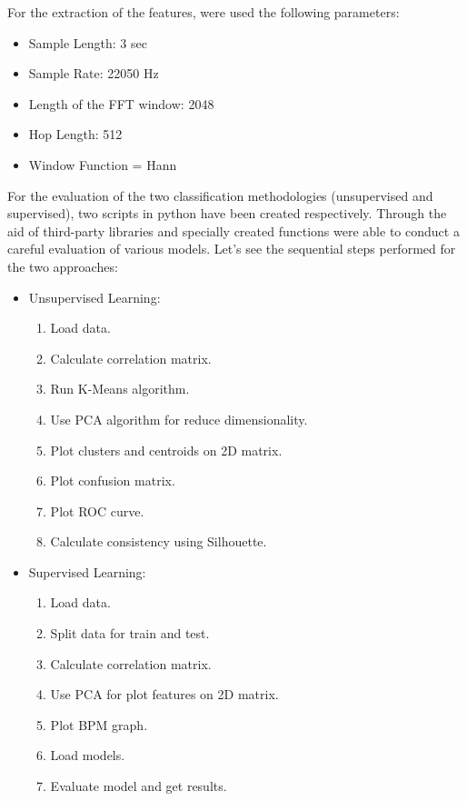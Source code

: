 \documentclass[conference]{IEEEtran}
\begin{document}
\noindent
For the extraction of the features, were used the following parameters:
\vspace{2mm} %
\begin{itemize}\small
    \item Sample Length: 3 sec
    \item Sample Rate: 22050 Hz
    \item Length of the FFT window: 2048
    \item Hop Length: 512
    \item Window Function = Hann 
\end{itemize}
\vspace{2mm} %

\noindent
For the evaluation of the two classification methodologies (unsupervised and supervised), two scripts in python have been created respectively. Through the aid of third-party libraries and specially created functions were able to conduct a careful evaluation of various models. Let's see the sequential steps performed for the two approaches:
\begin{itemize}\small
    \item Unsupervised Learning:
    \begin{enumerate}
        \item Load data.
        \item Calculate correlation matrix.
        \item Run K-Means algorithm.
        \item Use PCA algorithm for reduce dimensionality.
        \item Plot clusters and centroids on 2D matrix.
        \item Plot confusion matrix.
        \item Plot ROC curve.
        \item Calculate consistency using Silhouette.
    \end{enumerate}
    \item Supervised Learning:
    \begin{enumerate}
        \item Load data.
        \item Split data for train and test.
        \item Calculate correlation matrix.
        \item Use PCA for plot features on 2D matrix.
        \item Plot BPM graph.
        \item Load models.
        \item Evaluate model and get results.
    \end{enumerate}
\end{itemize}
\end{document}
